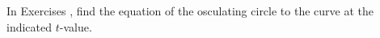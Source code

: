 {\noindent In Exercises}
{ , find the equation of the osculating circle to the curve at the indicated $t$-value.
}

